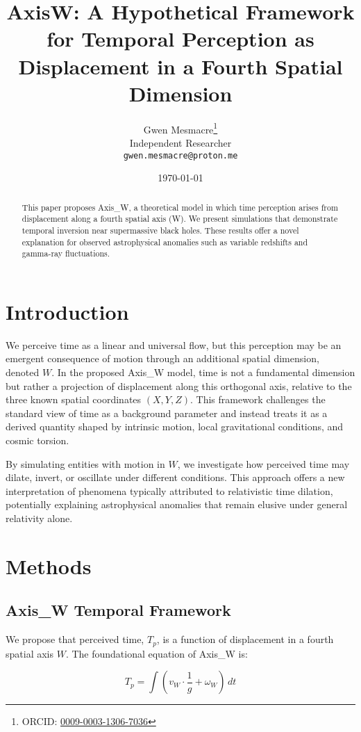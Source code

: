 \documentclass[12pt]{article}
\title{Axis{W}: A Hypothetical Framework for Temporal Perception as Displacement in a Fourth Spatial Dimension}
\author{
  Gwen Mesmacre\thanks{ORCID: \href{https://orcid.org/0009-0003-1306-7036}{0009-0003-1306-7036}}\\
  Independent Researcher\\
  \texttt{gwen.mesmacre@proton.me}
}
\date{\today}
\begin{document}
\maketitle

\begin{abstract}
This paper proposes Axis\_W, a theoretical model in which time perception arises from displacement along a fourth spatial axis (W). We present simulations that demonstrate temporal inversion near supermassive black holes. These results offer a novel explanation for observed astrophysical anomalies such as variable redshifts and gamma-ray fluctuations.
\end{abstract}

\section{Introduction}

We perceive time as a linear and universal flow, but this perception may be an emergent consequence of motion through an additional spatial dimension, denoted \( W \). In the proposed Axis\_W model, time is not a fundamental dimension but rather a projection of displacement along this orthogonal axis, relative to the three known spatial coordinates \( (X, Y, Z) \). This framework challenges the standard view of time as a background parameter and instead treats it as a derived quantity shaped by intrinsic motion, local gravitational conditions, and cosmic torsion.

By simulating entities with motion in \( W \), we investigate how perceived time may dilate, invert, or oscillate under different conditions. This approach offers a new interpretation of phenomena typically attributed to relativistic time dilation, potentially explaining astrophysical anomalies that remain elusive under general relativity alone.


\section{Methods}

\subsection{Axis\_W Temporal Framework}
We propose that perceived time, $T_p$, is a function of displacement in a fourth spatial axis $W$. The foundational equation of Axis\_W is:

\[
T_p = \int \left( v_W \cdot \frac{1}{g} + \omega_W \right) \, dt
\]
\end{document}
